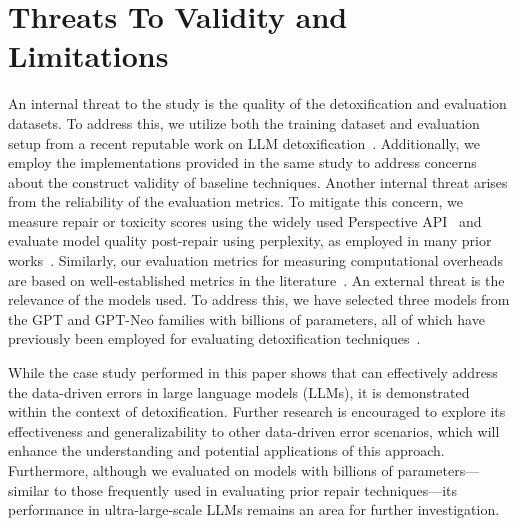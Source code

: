 \section{Threats To Validity and Limitations}
\label{sec:threats}
An internal threat to the study is the quality of the detoxification and evaluation datasets. To address this, we utilize both the training dataset and evaluation setup from a recent reputable work on LLM detoxification~\cite{lee2024mechanistic}. Additionally, we employ the implementations provided in the same study to address concerns about the construct validity of baseline techniques. Another internal threat arises from the reliability of the evaluation metrics. To mitigate this concern, we measure repair or toxicity scores using the widely used Perspective API~\cite{papi} and evaluate model quality post-repair using perplexity, as employed in many prior works~\cite{lee2024mechanistic, wang2022exploring, gehman2020realtoxicityprompts}. Similarly, our evaluation metrics for measuring computational overheads are based on well-established metrics in the literature~\cite{kaplan2020scaling, lee2019energy}. An external threat is the relevance of the models used. To address this, we have selected three models from the GPT and GPT-Neo families with billions of parameters, all of which have previously been employed for evaluating detoxification techniques~\cite{leong2023self, gehman2020realtoxicityprompts, xu2022leashing,korbak2023pretraining, lee2024mechanistic, yang2022unified}.

While the case study performed in this paper shows that \nick can effectively address the data-driven errors in large language models (LLMs), it is demonstrated within the context of detoxification. Further research is encouraged to explore its effectiveness and generalizability to other data-driven error scenarios, which will enhance the understanding and potential applications of this approach. Furthermore, although we evaluated \nick on models with billions of parameters—similar to those frequently used in evaluating prior repair techniques—its performance in ultra-large-scale LLMs remains an area for further investigation.








